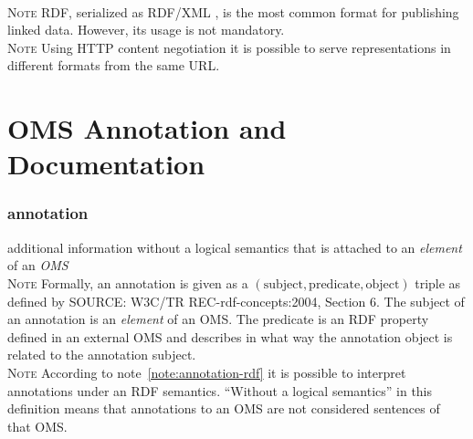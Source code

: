 \documentclass[10pt,%
\ifpretendfinal
final%
\else
draft%
\fi,
]{scrreprt}
\newcommand*{\termref}[1]{\textit{#1}}
\newcommand{\sclause}[1]{\section{#1}}
\newcommand{\termdefinition}[2]{\subsubsection*{\normalsize #1}#2}
\newcommand{\nisref}[1]{#1}
\newenvironment{definitions}[0]{\medskip }{}
\newenvironment{note}[0]{\ \\ \textsc{Note} \quad}{}
\begin{document}
\begin{definitions}
  \begin{note}
    RDF, serialized as RDF/XML \cite{W3C:REC-rdf-syntax-grammar-20040210}, is the most common format for publishing linked data.  However, its usage is not mandatory.
  \end{note}
  \begin{note}
    Using HTTP content negotiation \cite{rfc2616} it is possible to serve representations in different formats from the same URL.
  \end{note}
\end{definitions}

\sclause{OMS Annotation and Documentation}\label{c:terms-annotation}
 
\begin{definitions}
  \termdefinition{annotation}{additional information without a logical semantics that is attached to an \termref{element} of an \termref{OMS}}
  \begin{note}\label{note:annotation-rdf}
    Formally, an annotation is given as a $(\text{subject}, \text{predicate}, \text{object})$ triple as defined by \nisref{SOURCE: W3C/TR REC-rdf-concepts:2004, Section 6}.  The subject of an annotation is an \termref{element} of an OMS.  The predicate is an RDF property defined in an external OMS and describes in what way the annotation object is related to the annotation subject.
  \end{note}
  \begin{note}
    According to note~\ref{note:annotation-rdf} it is possible to interpret annotations under an RDF semantics.  ``Without a logical semantics'' in this definition means that annotations to an OMS are not considered sentences of that OMS.
  \end{note}

  

\end{definitions}
\end{document}
